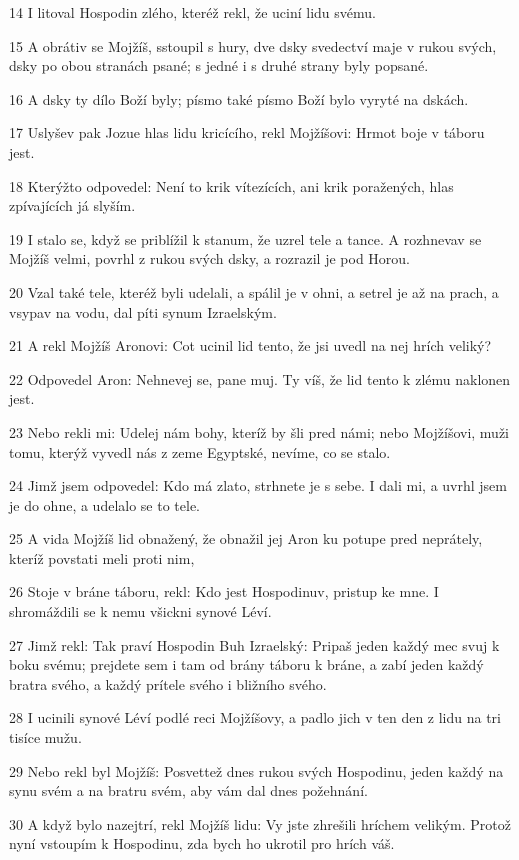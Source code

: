 \par 14 I litoval Hospodin zlého, kteréž rekl, že uciní lidu svému.
\par 15 A obrátiv se Mojžíš, sstoupil s hury, dve dsky svedectví maje v rukou svých, dsky po obou stranách psané; s jedné i s druhé strany byly popsané.
\par 16 A dsky ty dílo Boží byly; písmo také písmo Boží bylo vyryté na dskách.
\par 17 Uslyšev pak Jozue hlas lidu kricícího, rekl Mojžíšovi: Hrmot boje v táboru jest.
\par 18 Kterýžto odpovedel: Není to krik vítezících, ani krik poražených, hlas zpívajících já slyším.
\par 19 I stalo se, když se priblížil k stanum, že uzrel tele a tance. A rozhnevav se Mojžíš velmi, povrhl z rukou svých dsky, a rozrazil je pod Horou.
\par 20 Vzal také tele, kteréž byli udelali, a spálil je v ohni, a setrel je až na prach, a vsypav na vodu, dal píti synum Izraelským.
\par 21 A rekl Mojžíš Aronovi: Cot ucinil lid tento, že jsi uvedl na nej hrích veliký?
\par 22 Odpovedel Aron: Nehnevej se, pane muj. Ty víš, že lid tento k zlému naklonen jest.
\par 23 Nebo rekli mi: Udelej nám bohy, kteríž by šli pred námi; nebo Mojžíšovi, muži tomu, kterýž vyvedl nás z zeme Egyptské, nevíme, co se stalo.
\par 24 Jimž jsem odpovedel: Kdo má zlato, strhnete je s sebe. I dali mi, a uvrhl jsem je do ohne, a udelalo se to tele.
\par 25 A vida Mojžíš lid obnažený, že obnažil jej Aron ku potupe pred neprátely, kteríž povstati meli proti nim,
\par 26 Stoje v bráne táboru, rekl: Kdo jest Hospodinuv, pristup ke mne. I shromáždili se k nemu všickni synové Léví.
\par 27 Jimž rekl: Tak praví Hospodin Buh Izraelský: Pripaš jeden každý mec svuj k boku svému; prejdete sem i tam od brány táboru k bráne, a zabí jeden každý bratra svého, a každý prítele svého i bližního svého.
\par 28 I ucinili synové Léví podlé reci Mojžíšovy, a padlo jich v ten den z lidu na tri tisíce mužu.
\par 29 Nebo rekl byl Mojžíš: Posvettež dnes rukou svých Hospodinu, jeden každý na synu svém a na bratru svém, aby vám dal dnes požehnání.
\par 30 A když bylo nazejtrí, rekl Mojžíš lidu: Vy jste zhrešili hríchem velikým. Protož nyní vstoupím k Hospodinu, zda bych ho ukrotil pro hrích váš.

